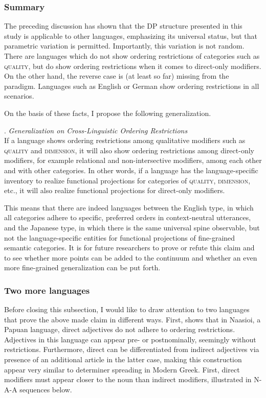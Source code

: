 \documentclass [output=book,colorlinks,citecolor=brown]{langscibook}
\begin{document}
\subsubsection{Summary}

The preceding discussion has shown that the DP structure presented in this study is applicable to other languages, emphasizing its universal status, but that parametric variation is permitted. Importantly, this variation is not random. There are languages which do not show ordering restrictions of categories such as \textsc{quality}, but do show ordering restrictions when it comes to direct-only modifiers. On the other hand, the reverse case is (at least so far) missing from the paradigm. Languages such as English or German show ordering restrictions in all scenarios. 

On the basis of these facts, I propose the following generalization. %

\ex. \emph{Generalization on Cross-Linguistic Ordering Restrictions}\\
If a language shows ordering restrictions among qualitative modifiers such as \textsc{quality} and \textsc{dimension}, it will also show ordering restrictions among direct-only modifiers, for example relational and non-intersective modifiers, among each other and with other categories. In other words, if a language has the language-specific inventory to realize functional projections for categories of \textsc{quality}, \textsc{dimension}, etc., it will also realize functional projections for direct-only modifiers.

This means that there are indeed languages between the English type, in which all categories adhere to specific, preferred orders in context-neutral utterances, and the Japanese type, in which there is the same universal spine observable, but not the language-specific entities for functional projections of fine-grained semantic categories. It is for future researchers to prove or refute this claim and to see whether more points can be added to the continuum and whether an even more fine-grained generalization can be put forth.

\subsubsection{Two more languages} \label{more languages}

Before closing this subsection, I would like to draw attention to two languages that prove the above made claim in different ways. First, \citet{brown:2024:adj} shows that in Naasioi, a Papuan language, direct adjectives do not adhere to ordering restrictions. Adjectives in this language can appear pre- or postnominally, seemingly without restrictions. Furthermore, direct can be differentiated from indirect adjectives via presence of an additional article in the latter case, making this construction appear very similar to determiner spreading in Modern Greek. First, direct modifiers must appear closer to the noun than indirect modifiers, illustrated in N-A-A sequences below. %
\end{document}

